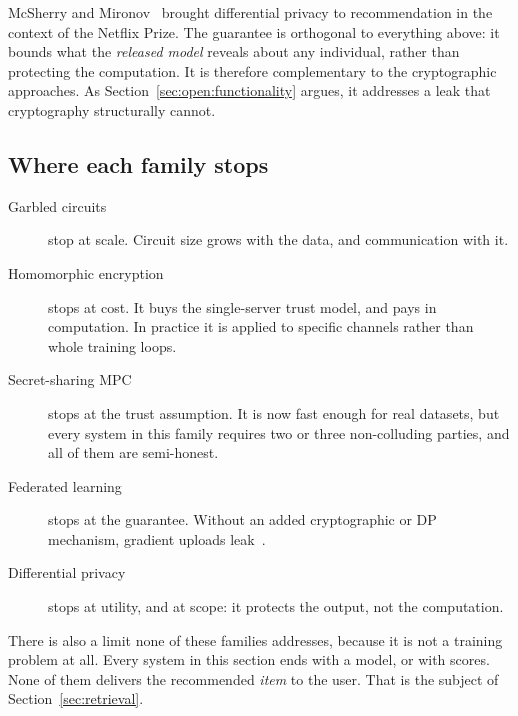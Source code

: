 McSherry and Mironov~\cite{mcsherry2009} brought differential privacy to recommendation in the
context of the Netflix Prize. The guarantee is orthogonal to everything above: it bounds what the
\emph{released model} reveals about any individual, rather than protecting the computation. It is
therefore complementary to the cryptographic approaches. As
Section~\ref{sec:open:functionality} argues, it addresses a leak that cryptography structurally
cannot.

\subsection{Where each family stops}
\label{sec:training:stops}

\begin{description}
  \item[Garbled circuits] stop at scale. Circuit size grows with the data, and communication with
        it.
  \item[Homomorphic encryption] stops at cost. It buys the single-server trust model, and pays in
        computation. In practice it is applied to specific channels rather than whole training
        loops.
  \item[Secret-sharing MPC] stops at the trust assumption. It is now fast enough for real
        datasets, but every system in this family requires two or three non-colluding parties, and
        all of them are semi-honest.
  \item[Federated learning] stops at the guarantee. Without an added cryptographic or DP
        mechanism, gradient uploads leak~\cite{chai2021}.
  \item[Differential privacy] stops at utility, and at scope: it protects the output, not the
        computation.
\end{description}

There is also a limit none of these families addresses, because it is not a training problem at
all. Every system in this section ends with a model, or with scores. None of them delivers the
recommended \emph{item} to the user. That is the subject of Section~\ref{sec:retrieval}.
